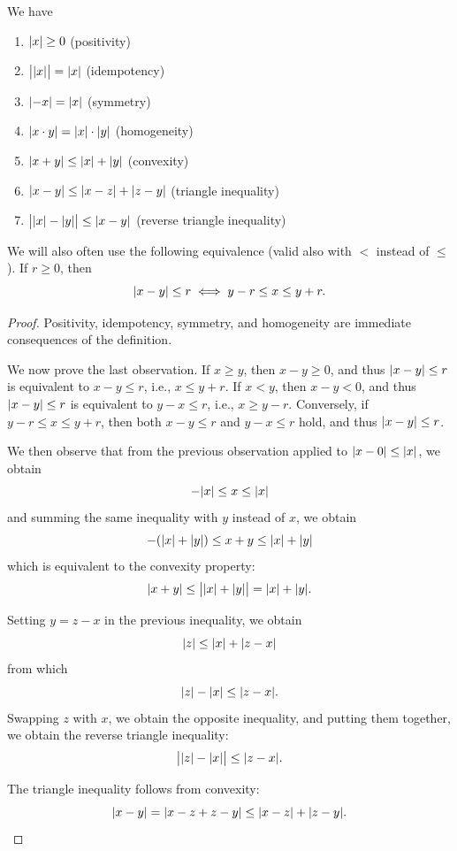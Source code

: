 \begin{proposition}
\mymark{**}
We have
\begin{enumerate}
\item ${\left|x\right|}\ge 0$ (positivity)
\item $\big\lvert{\left|x\right|}\big\rvert = {\left|x\right|}$ (idempotency)
\item ${\left|-x\right|} = {\left|x\right|}$ (symmetry)
\item ${\left|x\cdot y\right|} = {\left|x\right|}\cdot {\left|y\right|}$ (homogeneity)
\item ${\left|x+y\right|} \le {\left|x\right|} + {\left|y\right|}$ (convexity)
\item ${\left|x-y\right|} \le {\left|x-z\right|} + {\left|z-y\right|}$ (triangle inequality)
\item $\big\lvert{\left|x\right|}-{\left|y\right|}\big\rvert \le {\left|x-y\right|}$ (reverse triangle inequality)
\end{enumerate}
We will also often use the following equivalence (valid
also with $<$ instead of $\le$). If $r\ge 0$, then
\[
  {\left|x-y\right|} \le r
  \iff
  y - r \le x \le y + r.
\]
\end{proposition}
%
\begin{proof}
\mymark{*}
Positivity, idempotency, symmetry, and homogeneity are immediate consequences of
the definition.

We now prove the last observation.
If $x\ge y$, then $x-y\ge 0$, and thus ${\left|x-y\right|} \le r$ is
equivalent to $x-y\le r$, i.e., $x\le y+r$.
If $x<y$, then $x-y<0$, and thus ${\left|x-y\right|} \le r$ is
equivalent to $y-x \le r$, i.e., $x\ge y-r$.
Conversely, if $y-r \le x \le y+r$, then both $x-y \le r$ and $y-x \le r$ hold,
and
thus ${\left|x-y\right|}\le r$.

We then observe that from the previous observation applied
to ${\left|x-0\right|} \le {\left|x\right|}$, we obtain
\[
  -{\left|x\right|} \le x \le {\left|x\right|}
\]
and summing the same inequality with $y$ instead of $x$, we
obtain
\[
  -({\left|x\right|} + {\left|y\right|}) \le x + y \le {\left|x\right|} + {\left|y\right|}
\]
which is equivalent to the convexity property:
\[
  {\left|x+y\right|} \le \big\lvert{\left|x\right|} + {\left|y\right|}\big\rvert = {\left|x\right|} + {\left|y\right|}.
\]

Setting $y=z-x$ in the previous inequality, we obtain
\[
  {\left|z\right|} \le {\left|x\right|} + {\left|z-x\right|}
\]
from which
\[
  {\left|z\right|} - {\left|x\right|} \le {\left|z-x\right|}.
\]
Swapping $z$ with $x$, we obtain the opposite inequality,
and putting them together, we obtain
the reverse triangle inequality:
\[
\big\lvert {\left|z\right|}-{\left|x\right|} \big\rvert  \le {\left|z-x\right|}.
\]

The triangle inequality follows from convexity:
\[
  {\left|x-y\right|} = {\left|x-z + z-y\right|} \le {\left|x-z\right|} + {\left|z-y\right|}.
\]
\end{proof}

